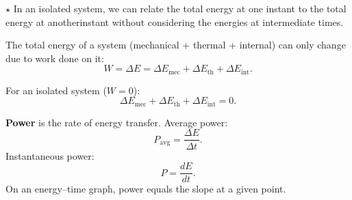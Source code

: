 \noindent $\star$ In an isolated system, we can relate the total energy at one instant to the total energy at anotherinstant without considering the energies at intermediate times.

The total energy of a system (mechanical + thermal + internal) can only change due to work done on it:
\[
W = \Delta E = \Delta E_{\text{mec}} + \Delta E_{\text{th}} + \Delta E_{\text{int}}.
\]

For an isolated system (\(W = 0\)):
\[
\Delta E_{\text{mec}} + \Delta E_{\text{th}} + \Delta E_{\text{int}} = 0.
\]

\textbf{Power} is the rate of energy transfer.  
Average power:
\[
P_{\text{avg}} = \frac{\Delta E}{\Delta t}.
\]
Instantaneous power:
\[
P = \frac{dE}{dt}.
\]
On an energy–time graph, power equals the slope at a given point.
